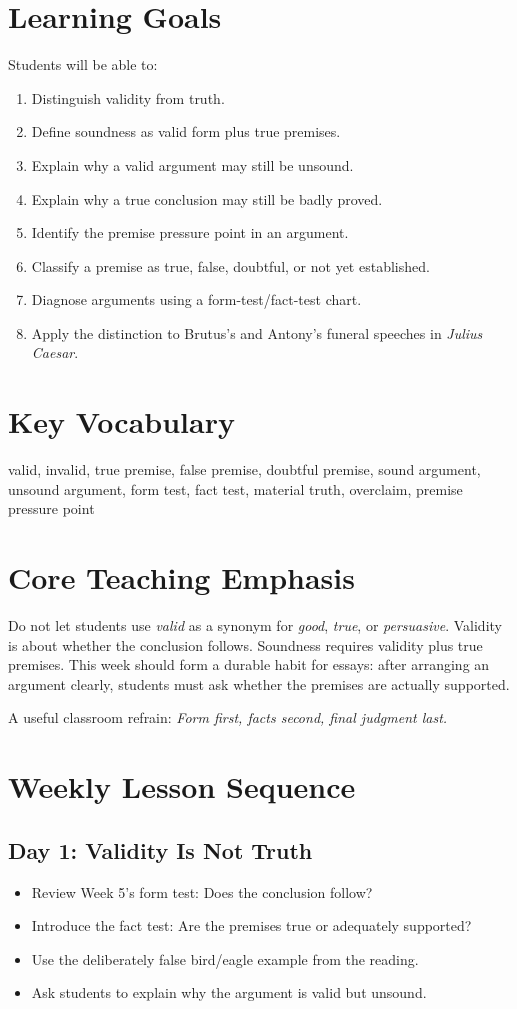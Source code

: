 \documentclass[12pt]{article}
\begin{document}
\section*{Learning Goals}
Students will be able to:
\begin{enumerate}[leftmargin=*]
\item Distinguish validity from truth.
\item Define soundness as valid form plus true premises.
\item Explain why a valid argument may still be unsound.
\item Explain why a true conclusion may still be badly proved.
\item Identify the premise pressure point in an argument.
\item Classify a premise as true, false, doubtful, or not yet established.
\item Diagnose arguments using a form-test/fact-test chart.
\item Apply the distinction to Brutus's and Antony's funeral speeches in \textit{Julius Caesar}.
\end{enumerate}

\section*{Key Vocabulary}
valid, invalid, true premise, false premise, doubtful premise, sound argument, unsound argument, form test, fact test, material truth, overclaim, premise pressure point

\section*{Core Teaching Emphasis}
Do not let students use \textit{valid} as a synonym for \textit{good}, \textit{true}, or \textit{persuasive}. Validity is about whether the conclusion follows. Soundness requires validity plus true premises. This week should form a durable habit for essays: after arranging an argument clearly, students must ask whether the premises are actually supported.

A useful classroom refrain: \textit{Form first, facts second, final judgment last.}

\section*{Weekly Lesson Sequence}

\subsection*{Day 1: Validity Is Not Truth}
\begin{itemize}[leftmargin=*]
\item Review Week 5's form test: Does the conclusion follow?
\item Introduce the fact test: Are the premises true or adequately supported?
\item Use the deliberately false bird/eagle example from the reading.
\item Ask students to explain why the argument is valid but unsound.
\end{itemize}
\end{document}

